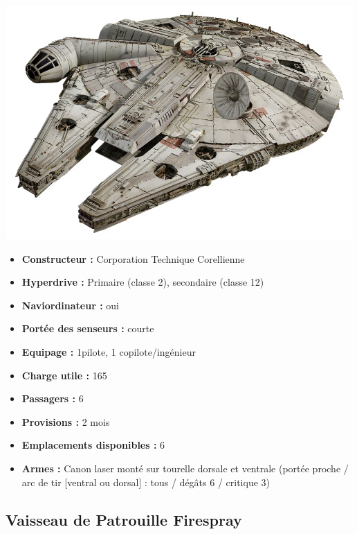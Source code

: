 \documentclass[twoside]{article}
\begin{document}
\noindent\begin{minipage}{0.3\textwidth}
	\includegraphics[width=1\linewidth]{../img/species/yt}
\end{minipage}%
\hfill%
\begin{minipage}{0.7\textwidth}\raggedleft
	\begin{itemize}
		\item \textbf{Constructeur :} Corporation Technique Corellienne
		\item \textbf{Hyperdrive :} Primaire (classe 2), secondaire (classe 12)
		\item \textbf{Naviordinateur :} oui
		\item \textbf{Portée des senseurs :} courte
		\item \textbf{Equipage :} 1pilote, 1 copilote/ingénieur
		\item \textbf{Charge utile :} 165
		\item \textbf{Passagers :} 6
		\item \textbf{Provisions :} 2 mois
		\item \textbf{Emplacements disponibles :} 6
		\item \textbf{Armes :} Canon laser monté sur tourelle dorsale et ventrale (portée proche / arc de tir [ventral ou dorsal] : tous / dégâts 6 / critique 3)
	\end{itemize}
\end{minipage}

\subsection*{Vaisseau de Patrouille Firespray}
\end{document}
